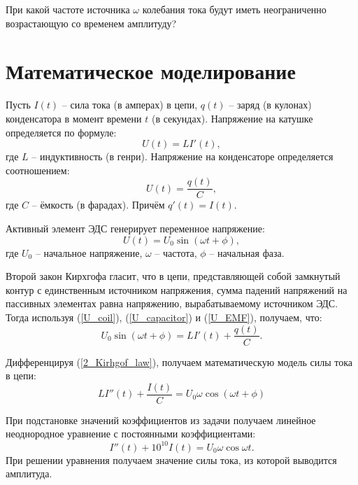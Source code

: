 \documentclass[a4paper,14pt]{extarticle}
\begin{document}
    При какой частоте источника $\omega$ колебания тока будут иметь неограниченно возрастающую со временем амплитуду?

    \section{Математическое моделирование}
    Пусть $I(t)$ -- сила тока (в амперах) в цепи, $q(t)$ -- заряд (в кулонах) конденсатора в момент времени $t$ (в секундах).
    Напряжение на катушке определяется по формуле:
    \begin{equation} \label{U_coil}
        U(t) = LI'(t),
    \end{equation}
    где $L$ -- индуктивность (в генри).
    Напряжение на конденсаторе определяется соотношением:
    \begin{equation} \label{U_capacitor}
        \displaystyle U(t) = \frac{q(t)}{C},
    \end{equation}
    где $C$ -- ёмкость (в фарадах). Причём $q'(t) = I(t)$.

    Активный элемент ЭДС генерирует переменное напряжение:
    \begin{equation} \label{U_EMF}
        U(t) = U_0 \sin(\omega t + \phi),
    \end{equation}
    где $U_0$ -- начальное напряжение, $\omega$ -- частота, $\phi$ -- начальная фаза.

    Второй закон Кирхгофа гласит, что в цепи, представляющей собой замкнутый контур с единственным источником напряжения, сумма падений напряжений на пассивных элементах равна напряжению, вырабатываемому источником ЭДС.
    Тогда используя (\ref{U_coil}), (\ref{U_capacitor}) и (\ref{U_EMF}), получаем, что:
    \begin{equation} \label{2_Kirhgof_law}
        \displaystyle U_0 \sin (\omega t + \phi) = LI'(t) + \frac{q(t)}{C}.
    \end{equation}

    Дифференцируя (\ref{2_Kirhgof_law}), получаем математическую модель силы тока в цепи:
    \begin{equation}
        LI''(t) + \frac{I(t)}{C} = U_0 \omega \cos(\omega t + \phi)
    \end{equation}

    При подстановке значений коэффициентов из задачи получаем линейное неоднородное уравнение с постоянными коэффициентами:
    \begin{equation} \label{model}
        I''(t) + 10^{10} I(t) = U_0 \omega \cos \omega t.
    \end{equation}
    При решении уравнения получаем значение силы тока, из которой выводится амплитуда.
\end{document}
